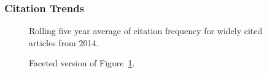 \documentclass[
  10pt,
  letterpaper,
  DIV=11,
  numbers=noendperiod,
  twoside]{scrartcl}
\begin{document}
\subsubsection*{Citation Trends}\label{citation-trends-38}

\begin{figure}


\caption{\label{fig-citation-spaghetti-2014}Rolling five year average of
citation frequency for widely cited articles from 2014.}

\end{figure}%

\begin{figure}


\caption{\label{fig-citation-facet-2014}Faceted version of
Figure~\ref{fig-citation-spaghetti-2014}.}

\end{figure}%
\end{document}

